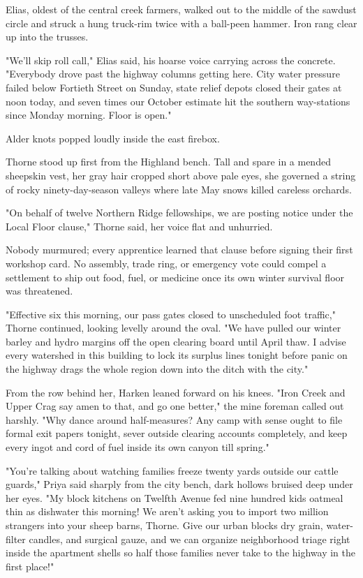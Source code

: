 Elias, oldest of the central creek farmers, walked out to the middle of the sawdust circle and struck a hung truck-rim twice with a ball-peen hammer. Iron rang clear up into the trusses.

"We'll skip roll call," Elias said, his hoarse voice carrying across the concrete. "Everybody drove past the highway columns getting here. City water pressure failed below Fortieth Street on Sunday, state relief depots closed their gates at noon today, and seven times our October estimate hit the southern way-stations since Monday morning. Floor is open."

Alder knots popped loudly inside the east firebox.

Thorne stood up first from the Highland bench. Tall and spare in a mended sheepskin vest, her gray hair cropped short above pale eyes, she governed a string of rocky ninety-day-season valleys where late May snows killed careless orchards.

"On behalf of twelve Northern Ridge fellowships, we are posting notice under the Local Floor clause," Thorne said, her voice flat and unhurried.

Nobody murmured; every apprentice learned that clause before signing their first workshop card. No assembly, trade ring, or emergency vote could compel a settlement to ship out food, fuel, or medicine once its own winter survival floor was threatened.

"Effective six this morning, our pass gates closed to unscheduled foot traffic," Thorne continued, looking levelly around the oval. "We have pulled our winter barley and hydro margins off the open clearing board until April thaw. I advise every watershed in this building to lock its surplus lines tonight before panic on the highway drags the whole region down into the ditch with the city."

From the row behind her, Harken leaned forward on his knees. "Iron Creek and Upper Crag say amen to that, and go one better," the mine foreman called out harshly. "Why dance around half-measures? Any camp with sense ought to file formal exit papers tonight, sever outside clearing accounts completely, and keep every ingot and cord of fuel inside its own canyon till spring."

"You're talking about watching families freeze twenty yards outside our cattle guards," Priya said sharply from the city bench, dark hollows bruised deep under her eyes. "My block kitchens on Twelfth Avenue fed nine hundred kids oatmeal thin as dishwater this morning! We aren't asking you to import two million strangers into your sheep barns, Thorne. Give our urban blocks dry grain, water-filter candles, and surgical gauze, and we can organize neighborhood triage right inside the apartment shells so half those families never take to the highway in the first place!"

